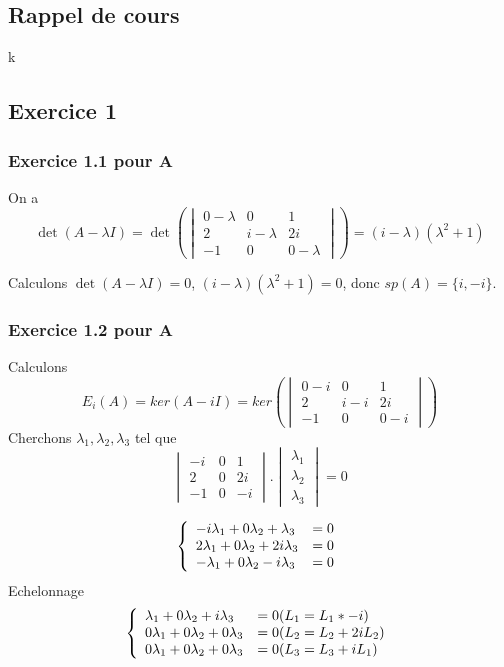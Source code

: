 \documentclass[]{book}
\theoremstyle{definition}
\begin{document}
\subsection*{Rappel de cours}k



\newpage
\subsection*{Exercice 1}
\subsubsection*{Exercice 1.1 pour A}
On a 
$$\det(A -\lambda I) = \det\left(\begin{vmatrix} 0-\lambda & 0 & 1 \\ 2 & i-\lambda & 2i \\ -1 & 0 & 0-\lambda \end{vmatrix}\right) = (i-\lambda)(\lambda^2+1)$$

Calculons $\det(A -\lambda I) = 0$, $(i-\lambda)(\lambda^2+1)=0$, donc $sp(A)=\{i, -i\}$. 

\subsubsection*{Exercice 1.2 pour A}
Calculons
$$E_{i}(A) = ker(A -iI) = ker\left(\begin{vmatrix} 0-i & 0 & 1 \\ 2 & i-i & 2i \\ -1 & 0 & 0-i \end{vmatrix}\right)$$
Cherchons $\lambda_1,\lambda_2,\lambda_3$  tel que
$$\begin{vmatrix} -i & 0 & 1 \\ 2 & 0 & 2i \\ -1 & 0 & -i \end{vmatrix}.\begin{vmatrix} \lambda_1 \\ \lambda_2 \\ \lambda_3 \end{vmatrix} = 0$$

$$
\left\{ 
\begin{array}{l l}
-i\lambda_{1} + 0\lambda_{2} + \lambda_{3} & = 0\\
2\lambda_{1} + 0\lambda_{2} + 2i\lambda_{3} & = 0\\
-\lambda_{1} + 0\lambda_{2} -i \lambda_{3} & = 0\\
\end{array}
\right. 
$$ 
Echelonnage
$$
\left\{ 
\begin{array}{l l}
\lambda_{1} + 0\lambda_{2} + i\lambda_{3} & = 0 (L_1=L_1*-i)\\
0\lambda_{1} + 0\lambda_{2} + 0\lambda_{3} & = 0 (L_2 = L_2+2iL_2)\\
0\lambda_{1} + 0\lambda_{2} + 0\lambda_{3} & = 0 (L_3 = L_3+iL_1)\\
\end{array}
\right. 
$$ 
\end{document}
